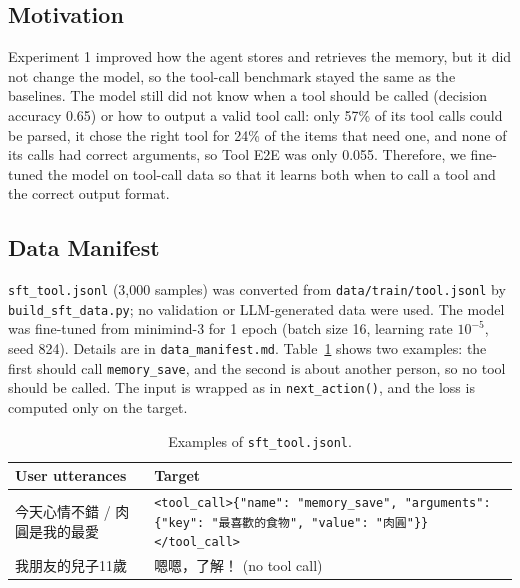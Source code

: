 \documentclass{article}
\begin{document}
\subsection{Motivation}
Experiment 1 improved how the agent stores and retrieves the memory, but it did not change the model, so the tool-call benchmark stayed the same as the baselines.
The model still did not know when a tool should be called (decision accuracy 0.65) or how to output a valid tool call:
only 57\% of its tool calls could be parsed, it chose the right tool for 24\% of the items that need one, and none of its calls had correct arguments, so Tool E2E was only 0.055.
Therefore, we fine-tuned the model on tool-call data so that it learns both when to call a tool and the correct output format.
\subsection{Data Manifest}
\texttt{sft\_tool.jsonl} (3,000 samples) was converted from \texttt{data/train/tool.jsonl} by \texttt{build\_sft\_data.py}; no validation or LLM-generated data were used.
The model was fine-tuned from minimind-3 for 1 epoch (batch size 16, learning rate $10^{-5}$, seed 824).
Details are in \texttt{data\_manifest.md}.
Table~\ref{tab:e2data} shows two examples: the first should call \texttt{memory\_save}, and the second is about another person, so no tool should be called.
The input is wrapped as in \texttt{next\_action()}, and the loss is computed only on the target.
\begin{table}[H]
    \centering
    \footnotesize
    \begin{tabular}{p{5.2cm}p{11.8cm}}
        \toprule
        User utterances & Target \\
        \midrule
        今天心情不錯 / 肉圓是我的最愛 & \texttt{<tool\_call>\{"name": "memory\_save", "arguments": \{"key": "最喜歡的食物", "value": "肉圓"\}\}</tool\_call>} \\
        我朋友的兒子11歲 & 嗯嗯，了解！ (no tool call) \\
        \bottomrule
    \end{tabular}
    \caption{Examples of \texttt{sft\_tool.jsonl}.}
    \label{tab:e2data}
\end{table}
\end{document}
